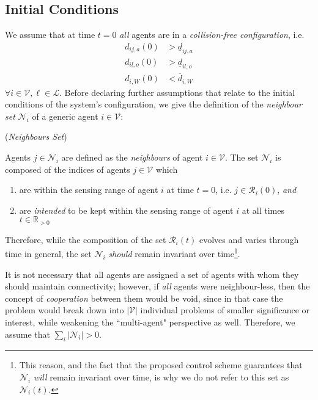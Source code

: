 \subsection{Initial Conditions}

We assume that at time $t=0$ \textit{all} agents are in a
\textit{collision-free configuration}, i.e.
\begin{subequations}
\begin{align}
    d_{ij,a}(0) &> \underline{d}_{ij,a} \\
    d_{il,o}(0) &> \underline{d}_{il,o} \\
    d_{i,W}(0)  &< \overline{d}_{i,W}
\label{eq:initially_coll_free}
\end{align}
\end{subequations}
$\forall i \in \mathcal{V}, \ell \in \mathcal{L}$. Before declaring further
assumptions that relate to the initial conditions of the system's configuration,
we give the definition of the \textit{neighbour set} $\mathcal{N}_i$ of a
generic agent $i \in \mathcal{V}$:
\begin{bw_box}
\begin{definition} (\textit{Neighbours Set})

Agents $j \in \mathcal{N}_i$ are defined as the \textit{neighbours} of
agent $i \in \mathcal{V}$. The set $\mathcal{N}_i$ is composed of the
indices of agents $j \in \mathcal{V}$ which
\begin{enumerate}
  \item are within the sensing range of agent $i$ at time $t=0$, i.e.
    $j \in \mathcal{R}_i(0)$, \textit{and}
  \item are \textit{intended} to be kept within the sensing range of agent $i$ at all
    times $t \in \mathbb{R}_{> 0}$
\end{enumerate}
\end{definition}
\end{bw_box}

Therefore, while the composition of the set $\mathcal{R}_i(t)$ evolves and
varies through time in general, the set $\mathcal{N}_i$ \textit{should} remain
invariant over time\footnote{This reason, and the fact that the proposed
control scheme guarantees that $\mathcal{N}_i$ \textit{will} remain invariant
over time, is why we do not refer to this set as $\mathcal{N}_i(t)$.}.

It is not necessary that all agents are assigned a set of agents with whom they
should maintain connectivity; however, if \textit{all} agents were
neighbour-less, then the concept of \textit{cooperation} between them would be
void, since in that case the problem would break down into $|\mathcal{V}|$
individual problems of smaller significance or interest, while weakening the
``multi-agent" perspective as well. Therefore, we assume that
$\sum\limits_i |\mathcal{N}_i| > 0$.

